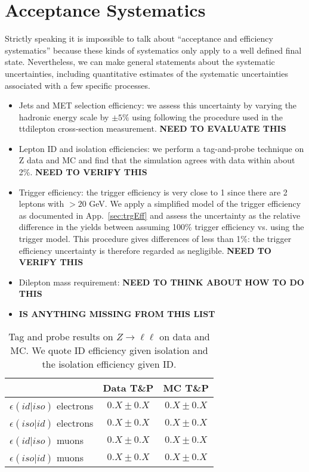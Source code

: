 \section{Acceptance Systematics}

Strictly speaking it is impossible to talk about 
``acceptance and efficiency systematics'' because these kinds of
systematics only apply to a well defined final state.
Nevertheless, we can make general statements about the 
systematic uncertainties, including quantitative
estimates of the systematic uncertainties associated with
a few specific processes. 
\begin{itemize}
  
\item Jets and MET selection efficiency: we assess this uncertainty by varying the hadronic energy scale by $\pm 5\%$ using
  following the procedure used in the ttdilepton cross-section measurement.   {\bf NEED TO EVALUATE THIS}
\item Lepton ID and isolation efficiencies: we perform a tag-and-probe technique
  on Z data and MC and find that the simulation agrees with data within about 2\%.  {\bf NEED TO VERIFY THIS}
\item Trigger efficiency: the trigger efficiency is very close to 1 since there are 2 leptons with \pt $> 20$ GeV.
  We apply a simplified model of the trigger efficiency as documented in App.~\ref{sec:trgEff} and assess the uncertainty
  as the relative difference in the yields between assuming 100\% trigger efficiency vs. using the trigger model. This
  procedure gives differences of less than 1\%: the trigger efficiency uncertainty is therefore regarded as negligible.
  {\bf NEED TO VERIFY THIS}
\item Dilepton mass requirement: {\bf NEED TO THINK ABOUT HOW TO DO THIS}
\item {\bf IS ANYTHING MISSING FROM THIS LIST}

\end{itemize}

\begin{table}[hbt]
\begin{center}
\caption{\label{tab:tagandprobe} Tag and probe results on $Z \to \ell \ell$
on data and MC.  We quote ID efficiency given isolation and 
the isolation efficiency given ID. }
\begin{tabular}{|l||c|c|}
\hline
                             & Data  T\&P      & MC T\&P             \\  
\hline
$\epsilon(id|iso)$ electrons & $0.X \pm 0.X$ & $0.X \pm 0.X$ \\
$\epsilon(iso|id)$ electrons & $0.X \pm 0.X$ & $0.X \pm 0.X$ \\
$\epsilon(id|iso)$ muons     & $0.X \pm 0.X$ & $0.X \pm 0.X$ \\
$\epsilon(iso|id)$ muons     & $0.X \pm 0.X$ & $0.X \pm 0.X$ \\ 
\hline
\end{tabular}
\end{center}
\end{table}